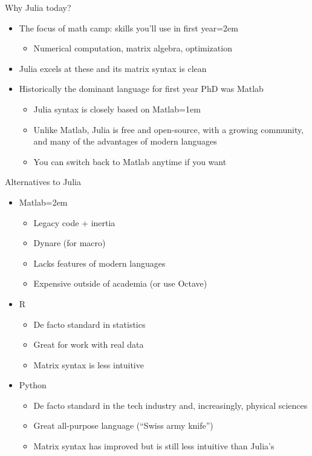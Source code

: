 \documentclass[handout]{beamer}
\begin{document}
\begin{frame}{Why Julia today?}
\begin{itemize}
    \item The focus of math camp: skills you'll use in first year\itemsep=2em
    \begin{itemize}
      \item Numerical computation, matrix algebra, optimization
    \end{itemize}
    \item Julia excels at these and its matrix syntax is clean
    \item<2-> Historically the dominant language for first year PhD was Matlab
    \begin{itemize}
        \item Julia syntax is closely based on Matlab\itemsep=1em
        \item Unlike Matlab, Julia is free and open-source, with a growing community, and many of the advantages of modern languages
        \item You can switch back to Matlab anytime if you want
    \end{itemize}
\end{itemize}
\end{frame}

\begin{frame}{Alternatives to Julia}
\begin{itemize}
    \item Matlab\itemsep=2em
    \begin{itemize}
        \item Legacy code + inertia
        \item Dynare (for macro)
        \item Lacks features of modern languages
        \item Expensive outside of academia (or use Octave)
    \end{itemize}
    \item<2-> R
    \begin{itemize}
        \item De facto standard in statistics
        \item Great for work with real data
        \item Matrix syntax is less intuitive
    \end{itemize}
    \item<3-> Python
    \begin{itemize}
        \item De facto standard in the tech industry and, increasingly, physical sciences
        \item Great all-purpose language (``Swiss army knife'')
        \item Matrix syntax has improved but is still less intuitive than Julia's
    \end{itemize}
\end{itemize}
\end{frame}
\end{document}
